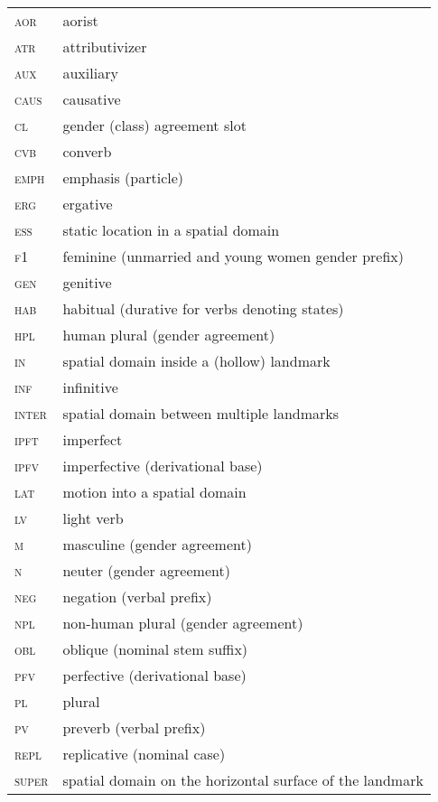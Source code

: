 ﻿\documentclass[output=paper]{langsci/langscibook}
\begin{document}
\begin{longtable}[l]{@{}ll@{}}
\textsc{aor}	& aorist \\
\textsc{atr}	& attributivizer \\
\textsc{aux}	& auxiliary \\
\textsc{caus}	& causative \\
\textsc{cl}	& gender (class) agreement slot \\
\textsc{cvb}	& converb \\
\textsc{emph}	& emphasis (particle) \\
\textsc{erg}	& ergative \\
\textsc{ess}	& static location in a spatial domain \\
\textsc{f1}	& feminine (unmarried and young women gender prefix) \\
\textsc{gen}	& genitive \\
\textsc{hab}	& habitual (durative for verbs denoting states) \\
\textsc{hpl}	& human plural (gender agreement) \\
\textsc{in}	& spatial domain inside a (hollow) landmark \\
\textsc{inf}	& infinitive \\
\textsc{inter}	& spatial domain between multiple landmarks \\
\textsc{ipft}	& imperfect \\
\textsc{ipfv}	& imperfective (derivational base) \\
\textsc{lat}	& motion into a spatial domain \\
\textsc{lv}	& light verb \\
\textsc{m}	& masculine (gender agreement) \\
\textsc{n}	& neuter (gender agreement) \\
\textsc{neg}	& negation (verbal prefix) \\
\textsc{npl}	& non-human plural (gender agreement) \\
\textsc{obl}	& oblique (nominal stem suffix) \\
\textsc{pfv}	& perfective (derivational base) \\
\textsc{pl}	& plural \\
\textsc{pv}	& preverb (verbal prefix) \\
\textsc{repl}	& replicative (nominal case) \\
\textsc{super}	& spatial domain on the horizontal surface of the landmark \\
\end{longtable}
\end{document}
